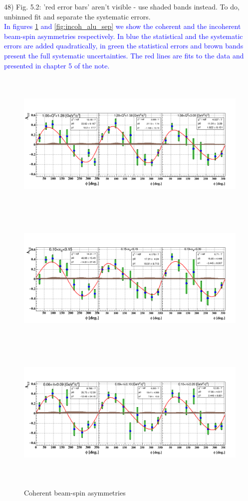 48) Fig. 5.2: 'red error bars' aren't visible - use shaded bands instead.
    To do, unbinned fit and separate the systematic errors. \\
    \textcolor{blue}{In figures \ref{fig:coh_alu_sep} and 
       \ref{fig:incoh_alu_sep} we show the coherent and the incoherent 
    beam-spin asymmetries respectively. In blue the statistical and the 
 systematic errors are added quadratically, in green the statistical errors and 
 brown bands present the full systematic uncertainties. The red lines are fits 
 to the data and presented in chapter 5 of the note. } \\
 \begin{figure}[tbp]
 \centering
 \includegraphics[height=7.0cm]{fig/coh_Q2_phi.png}
 \includegraphics[height=7.0cm]{fig/coh_xB_phi.png}
 \includegraphics[height=7.0cm]{fig/coh_t_phi.png}
 \caption{Coherent beam-spin asymmetries}
 \label{fig:coh_alu_sep}
 \end{figure}

